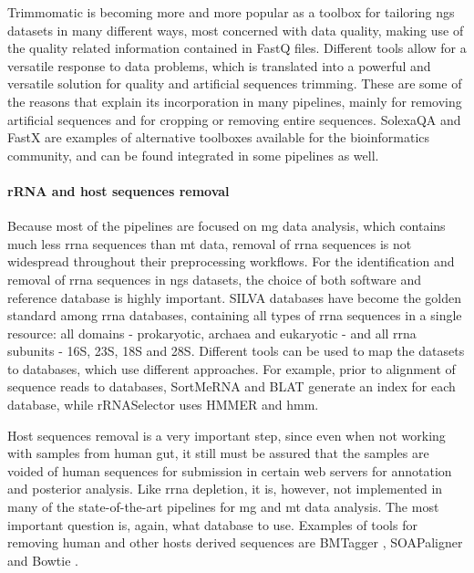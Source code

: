 \documentclass[
  oneside,
  11pt, a4paper,
  footinclude=true,
  headinclude=true,
  cleardoublepage=empty
]{scrbook}
\begin{document}
    Trimmomatic \citep{bolger2014trimmomatic} is becoming more and more popular as a toolbox for tailoring \gls{ngs} datasets in many different ways, most concerned with data quality, making use of the quality related information contained in FastQ files. Different tools allow for a versatile response to data problems, which is translated into a powerful and versatile solution for quality and artificial sequences trimming. These are some of the reasons that explain its incorporation in many pipelines, mainly for removing artificial sequences and for cropping or removing entire sequences. SolexaQA and FastX \citep{gordon2010fastx} are examples of alternative toolboxes available for the bioinformatics community, and can be found integrated in some pipelines as well.
    
    \paragraph{rRNA and host sequences removal}
    
    Because most of the pipelines are focused on \gls{mg} data analysis, which contains much less \gls{rrna} sequences than \gls{mt} data, removal of \gls{rrna} sequences is not widespread throughout their preprocessing workflows. For the identification and removal of \gls{rrna} sequences in \gls{ngs} datasets, the choice of both software and reference database is highly important. SILVA databases \citep{quast2012silva} have become the golden standard among \gls{rrna} databases, containing all types of \gls{rrna} sequences in a single resource: all domains - prokaryotic, archaea and eukaryotic - and all \gls{rrna} subunits - 16S, 23S, 18S and 28S. Different tools can be used to map the datasets to databases, which use different approaches. For example, prior to alignment of sequence reads to databases, SortMeRNA \citep{doi:10.1093/bioinformatics/bts611} and BLAT \citep{kent2002blat} generate an index for each database, while rRNASelector \citep{lee2011rrnaselector} uses HMMER and \gls{hmm}.
    
    Host sequences removal is a very important step, since even when not working with samples from human gut, it still must be assured that the samples are voided of human sequences for submission in certain web servers for annotation and posterior analysis. Like \gls{rrna} depletion, it is, however, not implemented in many of the state-of-the-art pipelines for \gls{mg} and \gls{mt} data analysis. The most important question is, again, what database to use. Examples of tools for removing human and other hosts derived sequences are BMTagger \citep{rotmistrovsky2011bmtagger}, SOAPaligner \citep{gu2013using} and Bowtie \citep{langmead2012fast}.
\end{document}
